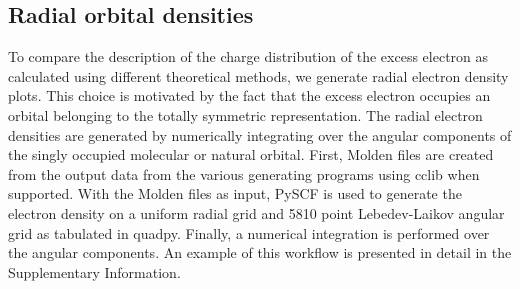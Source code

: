 \subsection{Radial orbital densities}
To compare the description of the charge distribution of the excess electron as calculated using different theoretical methods, we generate radial electron density plots.
This choice is motivated by the fact that the excess electron occupies an orbital belonging to the totally symmetric representation.
The radial electron densities are generated by numerically integrating over the angular components of the singly occupied molecular or natural orbital.
First, Molden files are created from the output data from the various generating programs using cclib when supported.\cite{cclib}
With the Molden files as input, PySCF is used to generate the electron density on a uniform radial grid and 5810 point Lebedev-Laikov angular grid as tabulated in quadpy.\cite{pyscf1,pyscf2,lebedevlaikov,quadpy}
Finally, a numerical integration is performed over the angular components. 
An example of this workflow is presented in detail in the Supplementary Information.


